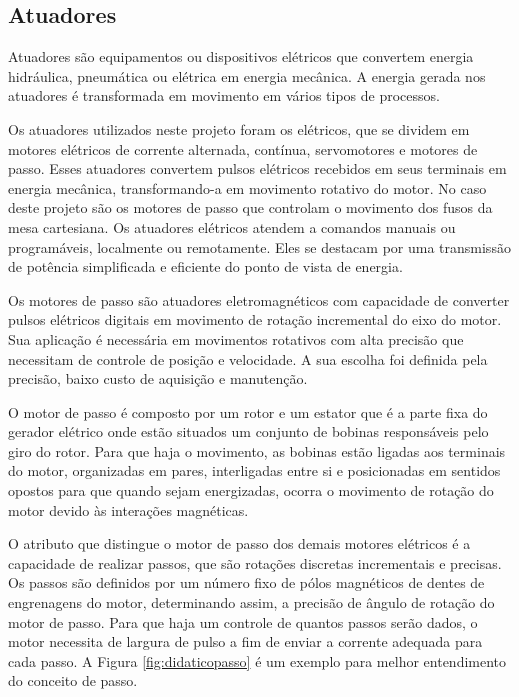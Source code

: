 \subsection{Atuadores}\label{subsec:metatuadores}

Atuadores são equipamentos ou dispositivos elétricos que convertem energia hidráulica, pneumática 
ou elétrica em energia mecânica. A energia gerada nos atuadores é transformada em movimento em 
vários tipos de processos.

Os atuadores utilizados neste projeto foram os elétricos, que se dividem em motores elétricos de 
corrente alternada, contínua, servomotores e motores de passo. Esses atuadores convertem pulsos 
elétricos recebidos em seus terminais em energia mecânica, transformando-a em movimento rotativo 
do motor. No caso deste projeto são os motores de passo que controlam o movimento dos fusos da mesa 
cartesiana. Os atuadores elétricos atendem a comandos manuais ou programáveis, localmente ou remotamente. 
Eles se destacam por uma transmissão de potência simplificada e eficiente do ponto de vista de energia.

Os motores de passo são atuadores eletromagnéticos com capacidade de converter pulsos elétricos digitais 
em movimento de rotação incremental do eixo do motor. Sua aplicação é necessária em movimentos 
rotativos com alta precisão que necessitam de controle de posição e velocidade. A sua escolha foi definida 
pela precisão, baixo custo de aquisição e manutenção.

O motor de passo é composto por um rotor e um estator que é a parte fixa do gerador 
elétrico onde estão situados um conjunto de bobinas responsáveis pelo giro do rotor. 
Para que haja o movimento, as bobinas estão ligadas aos terminais do motor, organizadas em pares, 
interligadas entre si e posicionadas em sentidos opostos para que quando sejam energizadas, 
ocorra o movimento de rotação do motor devido às interações magnéticas.

O atributo que distingue o motor de passo dos demais motores elétricos é a capacidade de realizar passos, 
que são rotações discretas incrementais e precisas. Os passos são definidos por um número fixo de 
pólos magnéticos de dentes de engrenagens do motor, determinando assim, a precisão de ângulo de rotação 
do motor de passo. Para que haja um controle de quantos passos serão dados, o motor necessita de 
largura de pulso a fim de enviar a corrente adequada para cada passo. A Figura \ref{fig:didaticopasso} 
é um exemplo para melhor entendimento do conceito de passo.


